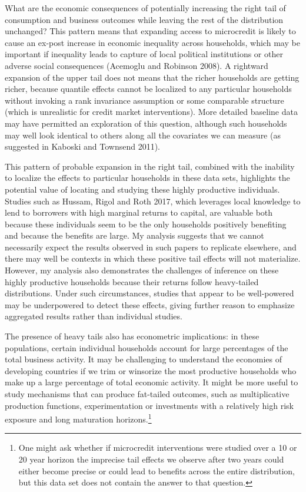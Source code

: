 \documentclass[english,12pt]{article}\usepackage{lmodern}
\numberwithin{equation}{section}
\begin{document}
What are the economic consequences of potentially increasing the right tail of consumption and business outcomes while leaving the rest of the distribution unchanged? This pattern means that expanding access to microcredit is likely to cause an ex-post increase in economic inequality across households, which may be important if inequality leads to capture of local political institutions or other adverse social consequences (Acemoglu and Robinson 2008). A rightward expansion of the upper tail does not means that the richer households are getting richer, because quantile effects cannot be localized to any particular households without invoking a rank invariance assumption or some comparable structure (which is unrealistic for credit market interventions). More detailed baseline data may have permitted an exploration of this question, although such households may well look identical to others along all the covariates we can measure (as suggested in Kaboski and Townsend 2011).

This pattern of probable expansion in the right tail, combined with the inability to localize the effects to particular households in these data sets, highlights the potential value of locating and studying these highly productive individuals. Studies such as Hussam, Rigol and Roth 2017, which leverages local knowledge to lend to borrowers with high marginal returns to capital, are valuable both because these individuals seem to be the only households positively benefiting and because the benefits are large. My analysis suggests that we cannot necessarily expect the results observed in such papers to replicate elsewhere, and there may well be contexts in which these positive tail effects will not materialize. However, my analysis also demonstrates the challenges of inference on these highly productive households because their returns follow heavy-tailed distributions. Under such circumstances, studies that appear to be well-powered may be underpowered to detect these effects, giving further reason to emphasize aggregated results rather than individual studies.



The presence of heavy tails also has econometric implications: in these populations, certain individual households account for large percentages of the total business activity. It may be challenging to understand the economies of developing countries if we trim or winsorize the most productive households who make up a large percentage of total economic activity. It might be more useful to study mechanisms that can produce fat-tailed outcomes, such as multiplicative production functions, experimentation or investments with a relatively high risk exposure and long maturation horizons.\footnote{One might ask whether if microcredit interventions were studied over a 10 or 20 year horizon the imprecise tail effects we observe after two years could either become precise or could lead to benefits across the entire distribution, but this data set does not contain the answer to that question.}
\end{document}

